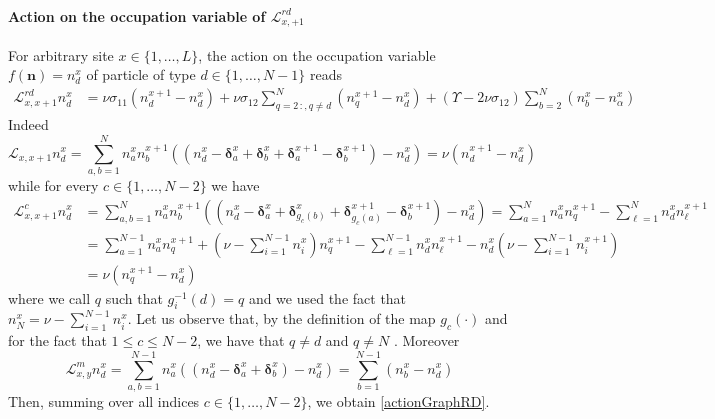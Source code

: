 \documentclass[10pt]{article}
\numberwithin{equation}{section}
\numberwithin{equation}{subsection}
\begin{document}
\paragraph{Action on the occupation variable of $\mathcal{L}_{x,+1}^{rd}$}
For arbitrary site $x\in \{1,\ldots,L\}$, the action on the occupation variable $f(\bm{n})=n_{d}^{x}$ of particle of type $d\in \{1,\ldots,N-1\}$ reads
\begin{equation}\label{actionGraphRD}
	\begin{split}
		\mathcal{L}_{x,x+1}^{rd}n_{d}^{x}&=\nu \sigma_{11}(n_{d}^{x+1}-n_{d}^{x})+\nu\sigma_{12}\sum_{q=2\,:	,q\neq d}^{N}(n_{q}^{x+1}-n_{d}^{x})+(\Upsilon-2\nu\sigma_{12})\sum_{b=2}^{N}(n_{b}^{x}-n_{\alpha}^{x})
	\end{split}
\end{equation}
Indeed
\begin{equation}
	\mathcal{L}_{x,x+1}n_{d}^{x}=\sum_{a,b=1}^{N}n_{a}^{x}n_{b}^{x+1}\left((n_{d}^{x}-\bm{\delta}_{a}^{x}+\bm{\delta}_{b}^{x}+\bm{\delta}_{a}^{x+1}-\bm{\delta}_{b}^{x+1})-n_{d}^{x}\right)=\nu\left(n_{d}^{x+1}-n_{d}^{x}\right)
\end{equation}
while for every $c\in \{1,\ldots,N-2\}$ we have 
\begin{equation}
	\begin{split}
		\mathcal{L}_{x,x+1}^{c}n_{d}^{x}&=\sum_{a,b=1}^{N}n_{a}^{x}n_{b}^{x+1}\left((n_{d}^{x}-\bm{\delta}_{a}^{x}+\bm{\delta}_{g_{c}(b)}^{x}+\bm{\delta}_{g_{c}(a)}^{x+1}-\bm{\delta}_{b}^{x+1})-n_{d}^{x}\right)=\sum_{a=1}^{N}n_{a}^{x}n_{q}^{x+1}-\sum_{\ell=1}^{N}n_{d}^{x}n_{\ell}^{x+1}
		\\&=
		\sum_{a=1}^{N-1}n_{a}^{x}n_{q}^{x+1}+\left(\nu-\sum_{i=1}^{N-1}n_{i}^{x}\right)n_{q}^{x+1}-\sum_{\ell=1}^{N-1}n_{d}^{x}n_{\ell}^{x+1}-n_{d}^{x}\left(\nu-\sum_{i=1}^{N-1}n_{i}^{x+1}\right)
		\\&=
		\nu(n_{q}^{x+1}-n_{d}^{x})
	\end{split}
\end{equation}
where we call $q$ such that $g_{i}^{-1}(d)=q$ and we used the fact that $n_{N}^{x}=\nu-\sum_{i=1}^{N-1}n_{i}^{x}$. Let us observe that, by the definition of the map $g_{c}(\cdot)$ and for the fact that $1\leq c\leq N-2$, we have that $q\neq d$ and $q\neq N$ .
Moreover
\begin{equation}
	\mathcal{L}_{x,y}^{m}n_{d}^{x}=\sum_{a,b=1}^{N-1}n_{a}^{x}\left((n_{d}^{x}-\bm{\delta}_{a}^{x}+\bm{\delta}_{b}^{x})-n_{d}^{x}\right)=\sum_{b=1}^{N-1}(n_{b}^{x}-n_{d}^{x})
\end{equation}
Then, summing over all indices $c\in\{1,\ldots,N-2\}$, we obtain \eqref{actionGraphRD}.
\end{document}
